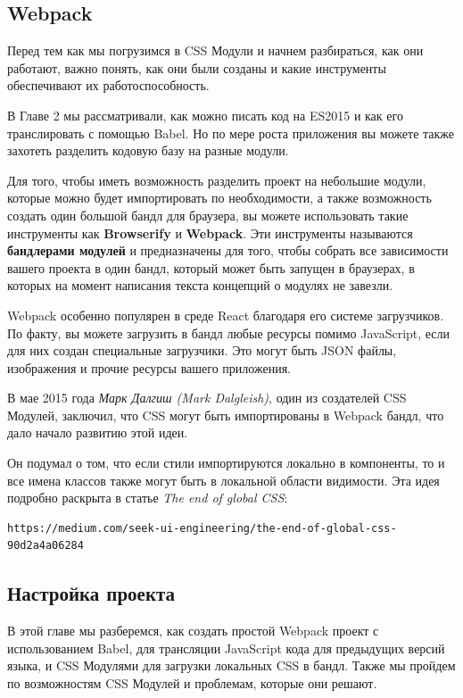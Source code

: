 \subsection{Webpack}

Перед тем как мы погрузимся в CSS Модули и начнем разбираться, как они работают, важно понять, как они были созданы и какие инструменты обеспечивают их работоспособность.

В Главе 2 мы рассматривали, как можно писать код на ES2015 и как его транслировать с помощью Babel. Но по мере роста приложения вы можете также захотеть разделить кодовую базу на разные модули.

Для того, чтобы иметь возможность разделить проект на небольшие модули, которые можно будет импортировать по необходимости, а также возможность создать один большой бандл для браузера, вы можете использовать такие инструменты как \textbf{Browserify} и \textbf{Webpack}. Эти инструменты называются \textbf{бандлерами модулей} и предназначены для того, чтобы собрать все зависимости вашего проекта в один бандл, который может быть запущен в браузерах, в которых на момент написания текста концепций о модулях не завезли.

Webpack особенно популярен в среде React благодаря его системе загрузчиков. По факту, вы можете загрузить в бандл любые ресурсы помимо JavaScript, если для них создан специальные загрузчики. Это могут быть JSON файлы, изображения и прочие ресурсы вашего приложения.

В мае 2015 года \textit{Марк Далгиш (Mark Dalgleish)}, один из создателей CSS Модулей, заключил, что CSS могут быть импортированы в Webpack бандл, что дало начало развитию этой идеи.

Он подумал о том, что если стили импортируются локально в компоненты, то и все имена классов также могут быть в локальной области видимости. Эта идея подробно раскрыта в статье \textit{The end of global CSS}:

\begin{lstlisting}
https://medium.com/seek-ui-engineering/the-end-of-global-css-90d2a4a06284
\end{lstlisting} 

\subsection{Настройка проекта}

В этой главе мы разберемся, как создать простой Webpack проект с использованием Babel, для трансляции JavaScript кода для предыдущих версий языка, и CSS Модулями для загрузки локальных CSS в бандл. Также мы пройдем по возможностям CSS Модулей и проблемам, которые они решают. 

